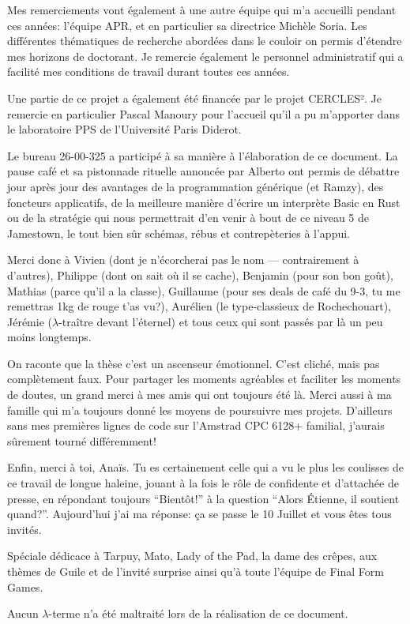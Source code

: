 {%

Mes remerciements vont également à une autre équipe qui m'a accueilli pendant
ces années: l'équipe APR, et en particulier sa directrice Michèle Soria. Les
différentes thématiques de recherche abordées dans le couloir on permis
d'étendre mes horizons de doctorant. Je remercie également le personnel
administratif qui a facilité mes conditions de travail durant toutes ces années.

Une partie de ce projet a également été financée par le projet CERCLES². Je
remercie en particulier Pascal Manoury pour l'accueil qu'il a pu m'apporter dans
le laboratoire PPS de l'Université Paris Diderot.


\setlength{\marginparwidth}{30mm}
Le bureau 26-00-325 a participé à sa manière à l'élaboration de ce document. La
pause café et sa pistonnade rituelle annoncée par Alberto ont permis de débattre
jour après jour des avantages de la programmation générique (et Ramzy), des
foncteurs applicatifs, de la meilleure manière d'écrire un interprète Basic en
Rust ou de la stratégie qui nous permettrait d'en venir à bout de ce niveau 5 de
Jamestown, le tout bien sûr schémas, rébus et contrepèteries à l'appui.

Merci donc à Vivien (dont je n'écorcherai pas le nom --- contrairement à
d'autres), Philippe (dont on sait où il se cache), Benjamin (pour son bon goût),
Mathias (parce qu'il a la classe), Guillaume (pour ses deals de café du 9-3, tu
me remettras 1kg de rouge t'as vu?), Aurélien (le type-classieux de
Rochechouart), Jérémie ($λ$-traître devant l'éternel) et tous ceux qui sont
passés par là un peu moins longtemps.


On raconte que la thèse c'est un ascenseur émotionnel. C'est cliché, mais pas
complètement faux. Pour partager les moments agréables et faciliter les moments
de doutes, un grand merci à mes amis qui ont toujours été là. Merci aussi à ma
famille qui m'a toujours donné les moyens de poursuivre mes projets. D'ailleurs
sans mes premières lignes de code sur l'Amstrad CPC 6128+ familial, j'aurais
sûrement tourné différemment!


Enfin, merci à toi, Anaïs. Tu es certainement celle qui a vu le plus les
coulisses de ce travail de longue haleine, jouant à la fois le rôle de
confidente et d'attachée de presse, en répondant toujours \enquote{Bientôt!} à
la question \enquote{Alors Étienne, il soutient quand?}. Aujourd'hui j'ai ma
réponse: ça se passe le 10 Juillet et vous êtes tous invités.

\vfill

\noindent
Spéciale dédicace à Tarpuy, Mato, Lady of the Pad, la dame des crêpes, aux
thèmes de Guile et de l'invité surprise ainsi qu'à toute l'équipe de Final Form
Games.

Aucun $λ$-terme n'a été maltraité lors de la réalisation de ce document.
}
